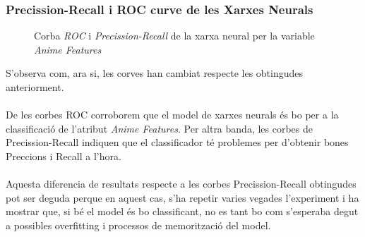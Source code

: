 \documentclass[a4paper, 11pt]{article}
\begin{document}
\subsubsection{Precission-Recall i ROC curve de les Xarxes Neurals}
\begin{figure}[h]
\centering
    \caption{Corba \textit{ROC} i \textit{Precission-Recall} de la xarxa neural per la variable \textit{Anime Features}}
    \label{fig:my_label}
\end{figure}
\hspace{-1.5em}S'observa com, ara si, les corves han cambiat respecte les obtingudes anteriorment. \\\\
De les corbes ROC corroborem que el model de xarxes neurals és bo per a la classificació de l'atribut \textit{Anime Features}. Per altra banda, les corbes de Precission-Recall indiquen que el classificador té problemes per d'obtenir bones Preccions i Recall a l'hora. \\\\
Aquesta diferencia de resultats respecte a les corbes Precission-Recall obtingudes pot ser deguda perque en aquest cas, s'ha repetir varies vegades l'experiment i ha mostrar que, si bé el model és bo classificant, no es tant bo com s'esperaba degut a possibles overfitting i processos de memorització del model.\\\\
\end{document}
